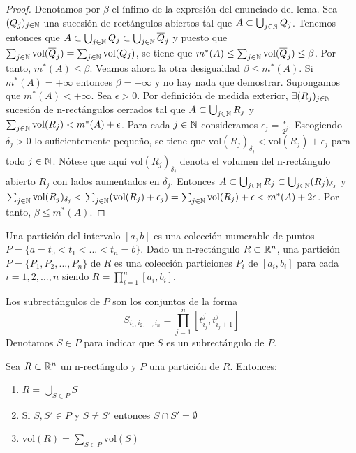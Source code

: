 \begin{proof}
    Denotamos por $\beta$ el ínfimo de la expresión del enunciado del lema. Sea $(Q_j)_{j \in \mathbb{N}}$ una sucesión de rectángulos abiertos tal que $A \subset \bigcup_{j \in \mathbb{N}} Q_j$. Tenemos entonces que $A \subset \bigcup_{j \in \mathbb{N}} Q_j \subset \bigcup_{j \in \mathbb{N}} \overline{Q}_j$ y puesto que $\sum_{j \in \mathbb{N}} \text{vol}(\overline{Q}_j) = \sum_{j \in \mathbb{N}} \text{vol}(Q_j)$, se tiene que $m^*(A) \leq \sum_{j \in \mathbb{N}} \text{vol}(\overline{Q}_j) \leq \beta$. Por tanto, $m^*(A) \leq \beta$. Veamos ahora la otra desigualdad $\beta \leq m^*(A)$. Si $m^*(A) = +\infty$ entonces $\beta = +\infty$ y no hay nada que demostrar. Supongamos que $m^*(A) < +\infty$. Sea $\epsilon > 0$. Por definición de medida exterior, $\exists (R_j)_{j \in \mathbb{N}}$ sucesión de n-rectángulos cerrados tal que $A \subset \bigcup_{j \in \mathbb{N}} R_j$ y $\sum_{j \in \mathbb{N}} \text{vol}(R_j) < m^*(A) + \epsilon$. Para cada $j \in \mathbb{N}$ consideramos $\epsilon_j = \frac{\epsilon}{2^j}$. Escogiendo $\delta_j > 0$ lo suficientemente pequeño, se tiene que $\text{vol}(R_j)_{\delta_j} < \text{vol}(R_j) + \epsilon_j$ para todo $j \in \mathbb{N}$. Nótese que aquí $\text{vol}(R_j)_{\delta_j}$ denota el volumen del n-rectángulo abierto $R_j$ con lados aumentados en $\delta_j$. Entonces $A \subset \bigcup_{j \in \mathbb{N}} R_j \subset \bigcup_{j \in \mathbb{N}} (R_j)_{\delta_j}$ y $\sum_{j \in \mathbb{N}} \text{vol}(R_j)_{\delta_j} < \sum_{j \in \mathbb{N}} (\text{vol}(R_j) + \epsilon_j) = \sum_{j \in \mathbb{N}} \text{vol}(R_j) + \epsilon < m^*(A) + 2\epsilon$. Por tanto, $\beta \leq m^*(A)$.
\end{proof}

\label{Partición de un Conjunto}
\begin{definición}
Una partición del intervalo $[a,b]$ es una colección numerable de puntos $P = \{a = t_0 < t_1 < ... < t_n = b\}$. Dado un n-rectángulo $R \subset \mathbb{R}^n$, una partición $P =  \{P_1, P_2, ..., P_n\}$ de $R$ es una colección particiones $P_i$ de $[a_i, b_i]$ para cada $i = 1, 2, ..., n$ siendo $R = \prod_{i=1}^n [a_i, b_i]$.
\end{definición}

Los subrectángulos de $P$ son los conjuntos de la forma
\begin{equation}
    S_{i_1, i_2, ..., i_n} = \prod_{j=1}^n [t_{i_j}^j, t_{i_j + 1}^j]
\end{equation}
Denotamos $S \in P$ para indicar que $S$ es un subrectángulo de $P$.

\begin{lema}
    Sea $R \subset \mathbb{R}^n$ un n-rectángulo y $P$ una partición de $R$. Entonces:
    \begin{enumerate}
        \item $R = \bigcup_{S \in P} S$
        \item Si $S, S' \in P$ y $S \neq S'$ entonces $S \cap S' = \emptyset$
        \item $\text{vol}(R) = \sum_{S \in P} \text{vol}(S)$
    \end{enumerate}
\end{lema}

